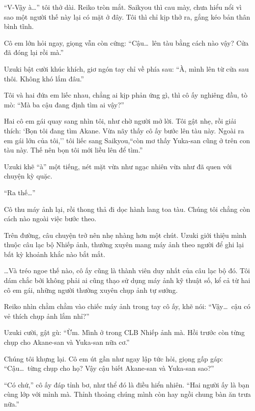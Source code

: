 \documentclass[../main.tex]{subfiles}
\begin{document}
``V-Vậy à\dots'' tôi thở dài. Reiko tròn mắt. Saikyou thì cau mày, chưa hiểu nổi vì sao một người thế này lại có mặt ở đây. Tôi thì chỉ kịp thở ra, gắng kéo bản thân bình tĩnh.

Cô em lớn hỏi ngay, giọng vẫn còn cứng: ``Cậu\dots\ lên tàu bằng cách nào vậy? Cửa đã đóng lại rồi mà.''

Uzuki bật cười khúc khích, giơ ngón tay chỉ về phía sau: ``À, mình lên từ cửa sau thôi. Không khó lắm đâu.''

Tôi và hai đứa em liếc nhau, chẳng ai kịp phản ứng gì, thì cô ấy nghiêng đầu, tò mò: ``Mà ba cậu đang định tìm ai vậy?''

Hai cô em gái quay sang nhìn tôi, như chờ người mở lời. Tôi gật nhẹ, rồi giải thích: `Bọn tôi đang tìm Akane. Vừa nãy thấy cô ấy bước lên tàu này. Ngoài ra em gái lớn của tôi,'' tôi liếc sang Saikyou,``còn mơ thấy Yuka-san cũng ở trên con tàu này. Thế nên bọn tôi mới liều lên để tìm.''

Uzuki khẽ ``à'' một tiếng, nét mặt vừa như ngạc nhiên vừa như đã quen với chuyện kỳ quặc.

``Ra thế\dots''

Cô thu máy ảnh lại, rồi thong thả đi dọc hành lang toa tàu. Chúng tôi chẳng còn cách nào ngoài việc bước theo.

\ct

Trên đường, câu chuyện trở nên nhẹ nhàng hơn một chút. Uzuki giới thiệu mình thuộc câu lạc bộ Nhiếp ảnh, thường xuyên mang máy ảnh theo người để ghi lại bất kỳ khoảnh khắc nào bắt mắt.

\dots Và tréo ngoe thế nào, cô ấy cũng là thành viên duy nhất của câu lạc bộ đó. Tôi dám chắc bởi không phải ai cũng thạo sử dụng máy ảnh kỹ thuật số, kể cả từ hai cô em gái, những người thường xuyên chụp ảnh tự sướng.

Reiko nhìn chằm chằm vào chiếc máy ảnh trong tay cô ấy, khẽ nói: ``Vậy\dots\ cậu có vẻ thích chụp ảnh lắm nhỉ?''

Uzuki cười, gật gù: ``Ừm. Mình ở trong CLB Nhiếp ảnh mà. Hồi trước còn từng chụp cho Akane-san và Yuka-san nữa cơ.''


Chúng tôi khựng lại. Cô em út gần như ngay lập tức hỏi, giọng gấp gáp:
``Cậu\dots\ từng chụp cho họ? Vậy cậu biết Akane-san và Yuka-san sao?''

``Có chứ,'' cô ấy đáp tỉnh bơ, như thể đó là điều hiển nhiên. ``Hai người ấy là bạn cùng lớp với mình mà. Thỉnh thoảng chúng mình còn hay ngồi chung bàn ăn trưa nữa.''
\end{document}
